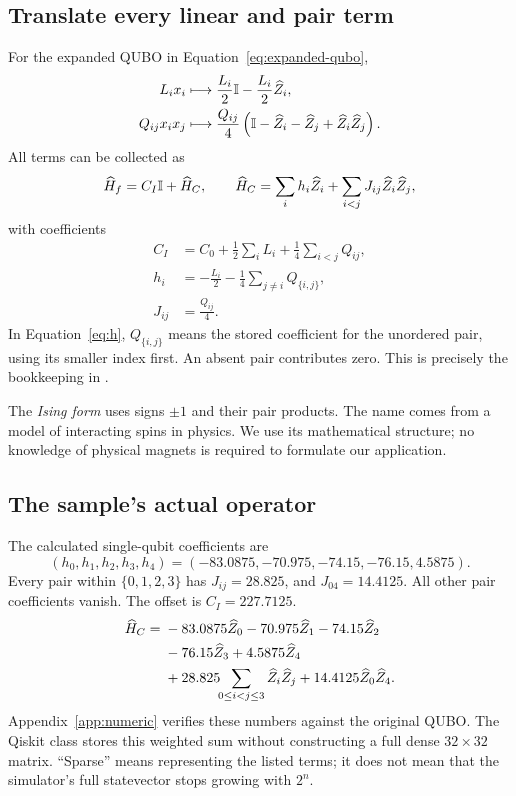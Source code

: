 \subsection{Translate every linear and pair term}
For the expanded QUBO in Equation~\eqref{eq:expanded-qubo},
\begin{align}
L_i x_i &\longmapsto \frac{L_i}{2}\mathbb{I}-\frac{L_i}{2}\widehat Z_i,\\
Q_{ij}x_i x_j &\longmapsto \frac{Q_{ij}}4
\left(\mathbb{I}-\widehat Z_i-\widehat Z_j+\widehat Z_i\widehat Z_j\right).
\end{align}
All terms can be collected as
\begin{equation}\label{eq:full-hamiltonian}
\widehat H_f=C_I\mathbb{I}+\widehat H_C,\qquad
\widehat H_C=\sum_i h_i\widehat Z_i+\sum_{i<j}J_{ij}\widehat Z_i\widehat Z_j,
\end{equation}
with coefficients
\begin{align}
C_I&=C_0+\frac12\sum_iL_i+\frac14\sum_{i<j}Q_{ij},\label{eq:offset}\\
h_i&=-\frac{L_i}{2}-\frac14\sum_{j\ne i}Q_{\{i,j\}},\label{eq:h}\\
J_{ij}&=\frac{Q_{ij}}4.\label{eq:j}
\end{align}
In Equation~\eqref{eq:h}, $Q_{\{i,j\}}$ means the stored coefficient for the
unordered pair, using its smaller index first. An absent pair contributes zero.
This is precisely the bookkeeping in .

The \emph{Ising form} uses signs $\pm1$ and their pair products. The name comes
from a model of interacting spins in physics. We use its mathematical structure;
no knowledge of physical magnets is required to formulate our application.

\subsection{The sample's actual operator}
The calculated single-qubit coefficients are
\begin{equation}
(h_0,h_1,h_2,h_3,h_4)
=(-83.0875,-70.975,-74.15,-76.15,4.5875).
\end{equation}
Every pair within $\{0,1,2,3\}$ has $J_{ij}=28.825$, and $J_{04}=14.4125$.
All other pair coefficients vanish. The offset is $C_I=227.7125$.
\begin{equation}\label{eq:actual-ising}
\begin{aligned}
\widehat H_C={}&-83.0875\widehat Z_0-70.975\widehat Z_1-74.15\widehat Z_2\\
&-76.15\widehat Z_3+4.5875\widehat Z_4\\
&+28.825\!\!\sum_{0\le i<j\le3}\widehat Z_i\widehat Z_j
+14.4125\widehat Z_0\widehat Z_4.
\end{aligned}
\end{equation}
Appendix~\ref{app:numeric} verifies these numbers against the original QUBO.
The Qiskit class  stores this weighted sum without constructing
a full dense $32\times32$ matrix. ``Sparse'' means representing the listed terms;
it does not mean that the simulator's full statevector stops growing with $2^n$.

